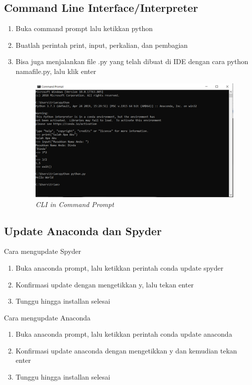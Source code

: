 \subsection{Command Line Interface/Interpreter}
\begin{enumerate}
\item Buka command prompt lalu ketikkan python
\item Buatlah perintah print, input, perkalian, dan pembagian
\item Bisa juga menjalankan file .py yang telah dibuat di IDE dengan cara python namafile.py, lalu klik enter
\begin{figure}[H]
    \centering
    \includegraphics[scale=0.5]{figures/cli}
    \caption{\textit{CLI in Command Prompt}}
    \label{CLI}
\end{figure}
\end{enumerate}

\subsection{Update Anaconda dan Spyder}
Cara mengupdate Spyder
\begin{enumerate}
\item Buka anaconda prompt, lalu ketikkan perintah conda update spyder
\item Konfirmasi update dengan mengetikkan y, lalu tekan enter
\item Tunggu hingga installan selesai
\end{enumerate}
Cara mengupdate Anaconda
\begin{enumerate}
\item Buka anaconda prompt, lalu ketikkan perintah conda update anaconda
\item Konfirmasi update anaconda dengan mengetikkan y dan kemudian tekan enter
\item Tunggu hingga installan selesai
\end{enumerate}
